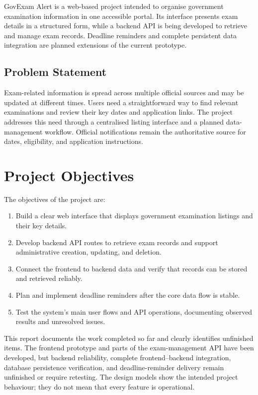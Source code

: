 \documentclass[12pt,a4paper]{report}
\begin{document}
GovExam Alert is a web-based project intended to organise government examination information in one accessible portal. Its interface presents exam details in a structured form, while a backend API is being developed to retrieve and manage exam records. Deadline reminders and complete persistent data integration are planned extensions of the current prototype.

\subsection{Problem Statement}
Exam-related information is spread across multiple official sources and may be updated at different times. Users need a straightforward way to find relevant examinations and review their key dates and application links. The project addresses this need through a centralised listing interface and a planned data-management workflow. Official notifications remain the authoritative source for dates, eligibility, and application instructions.

\section{Project Objectives}
The objectives of the project are:
\begin{enumerate}[label=\arabic*.]
  \item Build a clear web interface that displays government examination listings and their key details.
  \item Develop backend API routes to retrieve exam records and support administrative creation, updating, and deletion.
  \item Connect the frontend to backend data and verify that records can be stored and retrieved reliably.
  \item Plan and implement deadline reminders after the core data flow is stable.
  \item Test the system's main user flows and API operations, documenting observed results and unresolved issues.
\end{enumerate}

This report documents the work completed so far and clearly identifies unfinished items. The frontend prototype and parts of the exam-management API have been developed, but backend reliability, complete frontend--backend integration, database persistence verification, and deadline-reminder delivery remain unfinished or require retesting. The design models show the intended project behaviour; they do not mean that every feature is operational.
\end{document}
